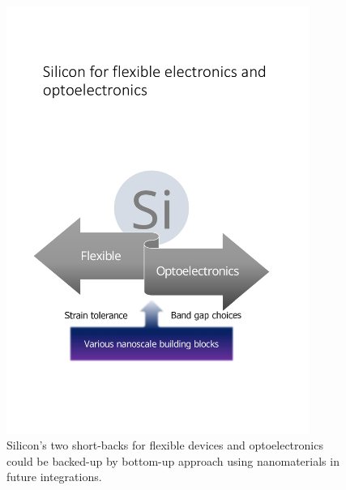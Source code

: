 \begin{figure}  
\centering
\includegraphics[width=280pt]{figures/figure1_silicon.pdf}
\caption[Future of optoelectronics and flexible electroncis]{Silicon's two short-backs for flexible devices and optoelectronics could be backed-up by bottom-up approach using nanomaterials in future integrations.
\label{fig:1si}}
\end{figure}

